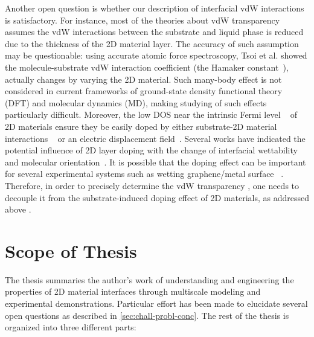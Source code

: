 Another open question is whether our description of interfacial vdW
interactions is satisfactory. For instance, most of the theories
about vdW
transparency~\autocite{Shih_2012_prl,Kim_2015_wetting_controversy} assumes
the vdW interactions between the substrate and liquid phase is reduced
due to the thickness of the 2D material layer.
%
The accuracy of such assumption may be questionable: using accurate atomic
force spectroscopy, Tsoi et al. showed the molecule-substrate vdW
interaction coefficient (the Hamaker
constant~\autocite{parsegian_van_2010_book}), actually changes by varying the
2D material\autocite{Tsoi_2014_vdW_screening_2D}.
%
Such many-body effect is not considered in current frameworks of
ground-state density functional theory (DFT) and molecular dynamics
(MD), making studying of such effects particularly difficult.
%
Moreover, the low DOS near the intrinsic Fermi level
~\autocite{Das_Sarma_2011_electron_gr,Bhimanapati_2015_2D_rev} of 2D
materials ensure they be easily doped by either substrate-2D material
interactions
~\autocite{Varchon_2007_elec_struc_gr_SiC,Giovannetti_2008_doping,Chen_2013_doping}
or an electric displacement
field~\autocite{Das_2008_doping,Perera_2013_doping}.
%
Several works have indicated the potential influence of 2D layer
doping with the change of interfacial wettability and molecular
orientation~\autocite{Huttmann_2015_vdw_gr_doping,Nguyen_2019_PEN}.
%
It is possible that the doping effect can be important for several
experimental systems such as wetting
graphene\allowbreak{}/\allowbreak{}metal
surface~\autocite{Giovannetti_2008_doping,Pi_2009_metal_doping_gr} .
%
Therefore, in order to precisely determine the vdW transparency , one
needs to decouple it from the substrate-induced doping effect of 2D
materials, as addressed above
\autocite{Huttmann_2015_vdw_gr_doping,Muruganathan_2015_tunable_vdw_gr,Hong_2016_mechanism,Ashraf_2016_doping}.


\section{Scope of  Thesis}
\label{sec:scope-thesis}

The thesis summaries the author's work of understanding and
engineering the properties of 2D material interfaces through
multiscale modeling and experimental demonstrations. Particular effort
has been made to elucidate several open questions as described in
\autoref{sec:chall-probl-conc}. The rest of the thesis is organized
into three different parts:

